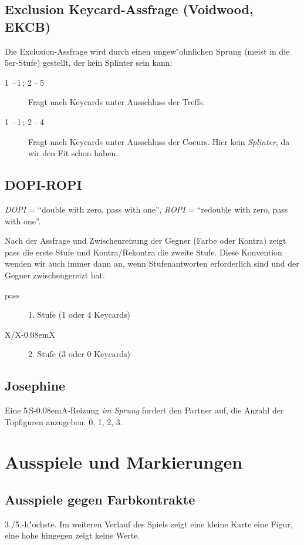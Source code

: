 \documentclass[11pt,german,twocolumn]{scrartcl}
\def\pik{\nobreak\,\Sp\xspace}
\def\coe{\nobreak\,\He\xspace}
\def\kar{\nobreak\,\Di\xspace}
\def\tre{\nobreak\,\Cl\xspace}
\def\sa{\nobreak\textsf{S\kern-0.08emA}\xspace}
\def\SA{\nobreak\,\sa}
\def\kontra{\textsf{X}\xspace}
\def\rekontra{\textsf{X\kern-0.08emX}\xspace}
\def\sep{\,--\,}
\newcommand{\conv}[1]{\emph{#1}}
\def\bdsc{\begin{description}}
\def\edsc{\end{description}}
\newcommand{\Index}[1]{#1\index{#1}}
\begin{document}
\subsection{Exclusion Keycard-Assfrage (Voidwood, EKCB)}

Die Exclusion-Assfrage wird durch einen ungew"ohnlichen Sprung
(meist in die 5er-Stufe) gestellt, der kein \Index{Splinter} sein kann:
%
\bdsc
\item[1\coe{}\sep1\pik; 2\coe{}\sep5\tre] Fragt nach Keycards unter
  Ausschluss der Treffs.
\item[1\tre{}\sep1\kar; 2\kar{}\sep4\coe] Fragt nach Keycards unter
  Ausschluss der Coeurs. Hier kein \conv{Splinter}, da wir den Fit schon
  haben.  \edsc

\subsection{\Index{DOPI-ROPI}}

\conv{DOPI} = ``double with zero, pass with one'', \conv{ROPI} =
``redouble with zero, pass with one''.

Nach der Assfrage und Zwischenreizung der Gegner (Farbe oder Kontra) zeigt pass
die erste Stufe und Kontra/Rekontra die zweite Stufe. Diese Konvention wenden
wir auch immer dann an, wenn Stufenantworten erforderlich sind und der Gegner
zwischengereizt hat.
%
\bdsc
  \item[pass] 1. Stufe (1 oder 4 Keycards)
  \item[\kontra/\rekontra] 2. Stufe (3 oder 0 Keycards)
\edsc

\subsection{Josephine}

Eine 5\SA-Reizung \emph{im Sprung} fordert den Partner auf, die Anzahl der
Topfiguren anzugeben: 0, 1, 2, 3.

\newpage
\section{Ausspiele und Markierungen}

\subsection{Ausspiele gegen Farbkontrakte}

3./5.-h"ochste. Im weiteren Verlauf des Spiels zeigt eine kleine Karte eine
Figur, eine hohe hingegen zeigt keine Werte.
\end{document}
